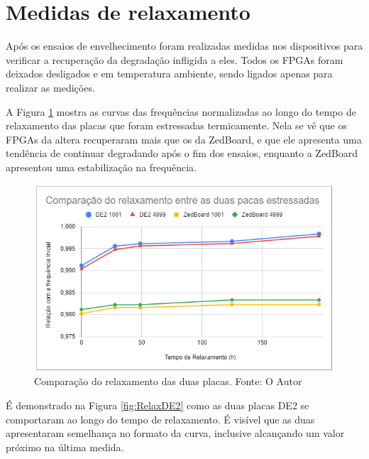 \section{Medidas de relaxamento}
\label{sec:ResRelax}

Após os ensaios de envelhecimento foram realizadas medidas nos dispositivos para verificar a recuperação da degradação infligida a eles. Todos os FPGAs foram deixados desligados e em temperatura ambiente, sendo ligados apenas para realizar as medições.

A Figura \ref{fig:RelaxEstressadas} mostra as curvas das frequências normalizadas ao longo do tempo de relaxamento das placas que foram estressadas termicamente. Nela se vê que os FPGAs da altera recuperaram mais que os da ZedBoard, e que ele apresenta uma tendência de continuar degradando após o fim dos ensaios, enquanto a ZedBoard apresentou uma estabilização na frequência.

\begin{figure}[H]
    \centering
    \includegraphics[scale=0.75]{figures/Resultados/RelaxEstressadas}
    \caption{Comparação do relaxamento das duas placas. Fonte: O Autor}
    \label{fig:RelaxEstressadas}
\end{figure}

É demonstrado na Figura \ref{fig:RelaxDE2} como as duas placas DE2 se comportaram ao longo do tempo de relaxamento. É visível que as duas apresentaram semelhança no formato da curva, inclusive alcançando um valor próximo na última medida. 

